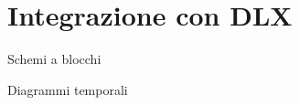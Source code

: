 \clearpage{\pagestyle{empty}\cleardoublepage}
\chapter{Integrazione con DLX}


Schemi a blocchi

Diagrammi temporali
